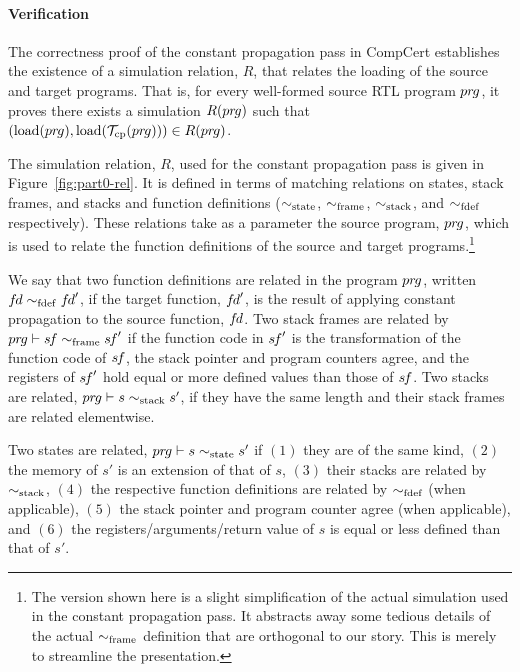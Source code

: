 




\paragraph{Verification}

The correctness proof of the constant propagation pass in CompCert establishes 
the existence of a simulation relation, $R$, that relates the loading of the source and target programs.
That is, for every well-formed source RTL program ${pr\hspace*{-1pt}g}$, it proves 
there exists a simulation $R({pr\hspace*{-1pt}g})$ such that 
$(\mathrm{load}({pr\hspace*{-1pt}g}),\mathrm{load}(\mathcal{T}_\mathrm{cp}({pr\hspace*{-1pt}g})))\in R({pr\hspace*{-1pt}g})$.

The simulation relation, $R$, used for the constant propagation pass is given in
Figure~\ref{fig:part0-rel}.  It is defined in terms of matching relations on states, stack frames,
and stacks and function definitions ($\sim_{\mathrm{state}}$, $\sim_{\mathrm{frame}}$, $\sim_{\mathrm{stack}}$, and $\sim_{\mathrm{fdef}}$
respectively).  These relations take as a parameter the source program, ${pr\hspace*{-1pt}g}$, which is used to
relate the function definitions of the source and target programs.\footnote{The version shown here
  is a slight simplification of the actual simulation used in the constant propagation pass.  It
  abstracts away some tedious details of the actual $\sim_{\mathrm{frame}}$ definition that are orthogonal to
  our story.  This is merely to streamline the presentation.}

We say that two function definitions are related in the program ${pr\hspace*{-1pt}g}$, written ${f\hspace*{-1pt}d} \sim_{\mathrm{fdef}} {f\hspace*{-1pt}d}'$, 
if the target function, ${f\hspace*{-1pt}d}'$, is the result of applying constant propagation to the source function, ${f\hspace*{-1pt}d}$.
Two stack frames are related by ${pr\hspace*{-1pt}g} \vdash {s\hspace*{-1pt}f}\sim_{\mathrm{frame}} {s\hspace*{-1pt}f}'$ if 
the function code in ${s\hspace*{-1pt}f}'$ is the transformation of the function code of ${s\hspace*{-1pt}f}$,
the stack pointer and program counters agree, and
the registers of ${s\hspace*{-1pt}f}'$ hold equal or more defined values than those of ${s\hspace*{-1pt}f}$.
Two stacks are related, ${pr\hspace*{-1pt}g} \vdash s\sim_{\mathrm{stack}} s'$, if they have the same length and their stack frames are related elementwise.

% 

Two states are related, ${pr\hspace*{-1pt}g} \vdash s \sim_{\mathrm{state}} s'$
if $(1)$ they are of the same kind, 
$(2)$ the memory of $s'$ is an extension of that of $s$, 
$(3)$ their stacks are related by $\sim_{\mathrm{stack}}$,
$(4)$ the respective function definitions are related by $\sim_{\mathrm{fdef}}$ (when applicable),
$(5)$ the stack pointer and program counter agree (when applicable), and
$(6)$ the registers/arguments/return value of $s$ is equal or less defined than that of $s'$. 

